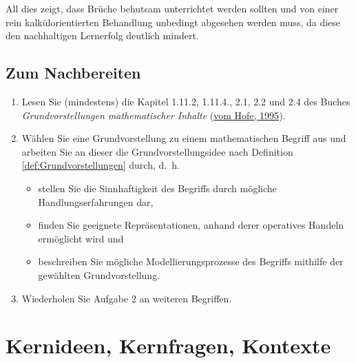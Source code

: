 \documentclass[
]{scrbook}
\providecommand{\tightlist}{%
  \setlength{\itemsep}{0pt}\setlength{\parskip}{0pt}}
\theoremstyle{definition}
\theoremstyle{definition}
\theoremstyle{definition}
\theoremstyle{definition}
\theoremstyle{remark}
\begin{document}
All dies zeigt, dass Brüche behutsam unterrichtet werden sollten und von einer rein kalkülorientierten Behandlung unbedingt abgesehen werden muss, da diese den nachhaltigen Lernerfolg deutlich mindert.

\hypertarget{grundvorstellungen-nachbereitung}{%
\section{Zum Nachbereiten}\label{grundvorstellungen-nachbereitung}}

\begin{enumerate}
\def\labelenumi{\arabic{enumi}.}
\tightlist
\item
  Lesen Sie (mindestens) die Kapitel 1.11.2, 1.11.4., 2.1, 2.2 und 2.4 des Buches \emph{Grundvorstellungen mathematischer Inhalte} (\protect\hyperlink{ref-Hofe:1995}{vom Hofe, 1995}).
\item
  Wählen Sie eine Grundvorstellung zu einem mathematischen Begriff aus und arbeiten Sie an dieser die Grundvorstellungsidee nach Definition \ref{def:Grundvorstellungen} durch, d.~h.

  \begin{itemize}
  \tightlist
  \item
    stellen Sie die Sinnhaftigkeit des Begriffs durch mögliche Handlungserfahrungen dar,
  \item
    finden Sie geeignete Repräsentationen, anhand derer operatives Handeln ermöglicht wird und
  \item
    beschreiben Sie mögliche Modellierungsprozesse des Begriffs mithilfe der gewählten Grundvorstellung.
  \end{itemize}
\item
  Wiederholen Sie Aufgabe 2 an weiteren Begriffen.
\end{enumerate}

\hypertarget{kernideen-kernfragen-kontexte}{%
\chapter{Kernideen, Kernfragen, Kontexte}\label{kernideen-kernfragen-kontexte}}
\end{document}
